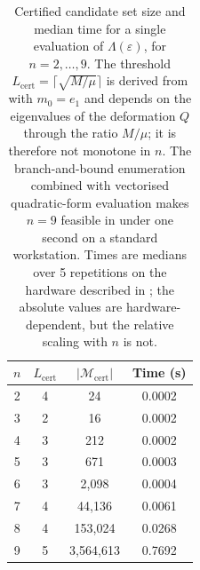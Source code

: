 \begin{table}[htbp]\centering
\caption{Certified candidate set size and median time for a single evaluation
of \(\Lambda(\varepsilon)\), for \(n=2,\dots,9\). The threshold
\(L_{\mathrm{cert}}=\lceil\sqrt{M/\mu}\rceil\) is derived from
 with \(m_0=e_1\) and depends on the eigenvalues of the
deformation \(Q\) through the ratio \(M/\mu\); it is therefore not monotone
in \(n\). The branch-and-bound enumeration combined with vectorised
quadratic-form evaluation makes \(n=9\) feasible in under one second on a
standard workstation. Times are medians over 5 repetitions on the hardware
described in ; the absolute values are
hardware-dependent, but the relative scaling with \(n\) is not.}
\label{tab:complexity}
\begin{tabular}{cccc}\hline
\(n\) & \(L_{\mathrm{cert}}\) & \(|\mathcal{M}_{\mathrm{cert}}|\) & Time (s) \\\hline
2 & 4 & 24 & 0.0002 \\
3 & 2 & 16 & 0.0002 \\
4 & 3 & 212 & 0.0002 \\
5 & 3 & 671 & 0.0003 \\
6 & 3 & 2{,}098 & 0.0004 \\
7 & 4 & 44{,}136 & 0.0061 \\
8 & 4 & 153{,}024 & 0.0268 \\
9 & 5 & 3{,}564{,}613 & 0.7692 \\
\hline\end{tabular}\end{table}
